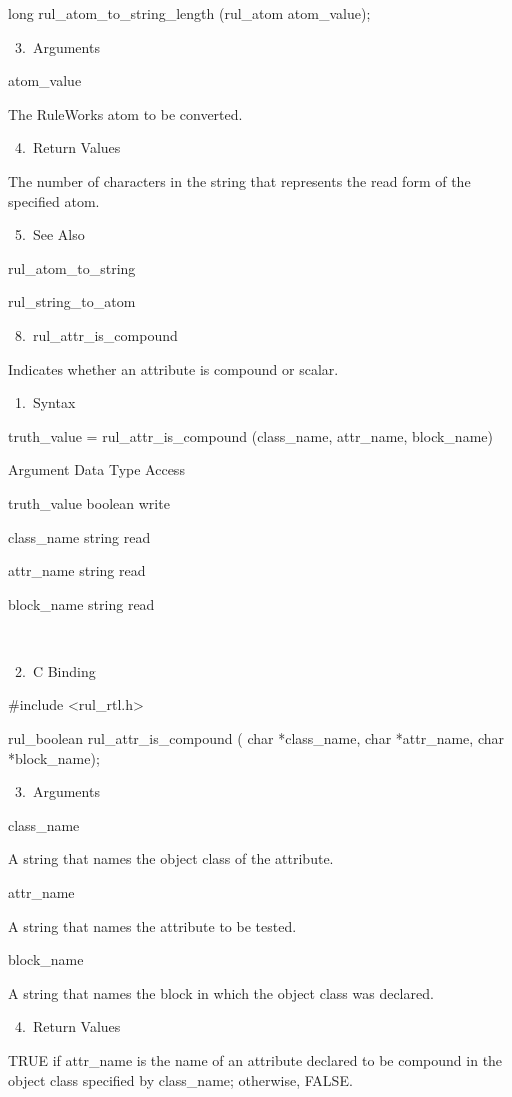           long rul_atom_to_string_length
          (rul_atom atom_value);

       3. Arguments

          atom_value

          The RuleWorks atom to be converted.

       4. Return Values

          The number of characters in the
          string that represents the read form
          of the specified atom.

       5. See Also

    rul_atom_to_string

    rul_string_to_atom

 8. rul_attr_is_compound

    Indicates whether an attribute is compound
    or scalar.

       1. Syntax

          truth_value = rul_attr_is_compound
          (class_name, attr_name, block_name)

          Argument  Data Type    Access

          truth_value  boolean    write

          class_name  string    read

          attr_name  string    read

          block_name  string    read

           

       2. C Binding

          #include <rul_rtl.h>

          rul_boolean rul_attr_is_compound (
          char *class_name,
          char *attr_name,
          char *block_name);

       3. Arguments

          class_name

          A string that names the object class
          of the attribute.

          attr_name

          A string that names the attribute to
          be tested.

          block_name

          A string that names the block in
          which the object class was declared.

       4. Return Values

          TRUE if attr_name is the name of an
          attribute declared to be compound in
          the object class specified by
          class_name; otherwise, FALSE.

